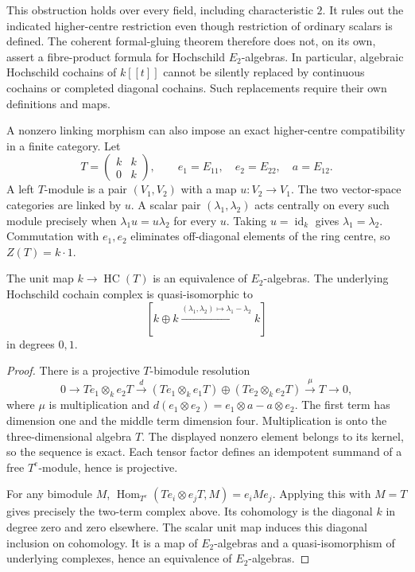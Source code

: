 This obstruction holds over every field, including characteristic
$2$. It rules out the indicated higher-centre restriction even
though restriction of ordinary scalars is defined.
The coherent formal-gluing theorem therefore does not, on its own,
assert a fibre-product formula for Hochschild $E_2$-algebras.
In particular, algebraic Hochschild cochains of $k[[t]]$ cannot be
silently replaced by continuous cochains or completed diagonal
cochains. Such replacements require their own definitions and maps.

A nonzero linking morphism can also impose an exact higher-centre
compatibility in a finite category.
Let
\[
 T=\begin{pmatrix}k&k\\0&k\end{pmatrix},\qquad
 e_1=E_{11},\quad e_2=E_{22},\quad a=E_{12}.
\]
A left $T$-module is a pair $(V_1,V_2)$ with a map $u:V_2\to V_1$.
The two vector-space categories are linked by $u$.
A scalar pair $(\lambda_1,\lambda_2)$ acts centrally on every such
module precisely when $\lambda_1u=u\lambda_2$ for every $u$.
Taking $u=\operatorname{id}_k$ gives $\lambda_1=\lambda_2$.
Commutation with $e_1,e_2$ eliminates off-diagonal elements of the
ring centre, so $Z(T)=k\cdot1$.

\begin{proposition}
\label{v4-arith:w5-h:triangular-centre}
The unit map $k\to\operatorname{HC}(T)$ is an equivalence of
$E_2$-algebras. The underlying Hochschild cochain complex is
quasi-isomorphic to
\[
 [k\oplus k\xrightarrow{(\lambda_1,\lambda_2)\mapsto
 \lambda_1-\lambda_2}k]
\]
in degrees $0,1$.
\end{proposition}
\begin{proof}
There is a projective $T$-bimodule resolution
\[
 0\longrightarrow Te_1\otimes_k e_2T
 \xrightarrow{d}
 (Te_1\otimes_k e_1T)\oplus(Te_2\otimes_k e_2T)
 \xrightarrow{\mu}T\longrightarrow0,
\]
where $\mu$ is multiplication and
$d(e_1\otimes e_2)=e_1\otimes a-a\otimes e_2$.
The first term has dimension one and the middle term dimension four.
Multiplication is onto the three-dimensional algebra $T$.
The displayed nonzero element belongs to its kernel, so the sequence
is exact. Each tensor factor defines an idempotent summand of a
free $T^e$-module, hence is projective.

For any bimodule $M$,
$\operatorname{Hom}_{T^e}(Te_i\otimes e_jT,M)=e_iMe_j$.
Applying this with $M=T$ gives precisely the two-term complex above.
Its cohomology is the diagonal $k$ in degree zero and zero elsewhere.
The scalar unit map induces this diagonal inclusion on cohomology.
It is a map of $E_2$-algebras and a quasi-isomorphism of underlying
complexes, hence an equivalence of $E_2$-algebras.
\end{proof}

